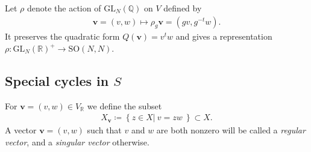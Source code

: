 \documentclass[a4paper,11pt]{amsart} %
\newcommand{\8}{\infty}
\newcommand{\vbf}{\mathbf{v}}
\newcommand{\SO}{\mathrm{SO}}
\newcommand{\GL}{\mathrm{GL}}
\newcommand{\R}{\mathbb{R}}
\newcommand{\Q}{\mathbb{Q}}
\theoremstyle{mytheoremstyle}
\theoremstyle{remark}
\numberwithin{equation}{section}
\begin{document}
Let $\rho$ denote the action of $\GL_N(\Q)$ on $V$ defined by 
\begin{align}
   \vbf=(v,w) \longmapsto \rho_g\vbf = (gv,g^{-t}w).
\end{align}
It preserves the quadratic form $Q(\vbf) =v^tw$ and gives a representation $\rho \colon \GL_N(\R)^+ \longrightarrow \SO(N,N)$.




\subsection{Special cycles in $S$}
For $\vbf=(v,w) \in V_\R$ we define the subset
\begin{align}
    X_{\vbf} \coloneqq \left \{ \left . z \in X \right \vert \ v=zw \ \right \} \subset X.
\end{align}
A vector $\vbf=(v,w)$ such that $v$ and $w$ are both nonzero will be called a {\em regular vector}, and a {\em singular vector} otherwise.
\end{document}
